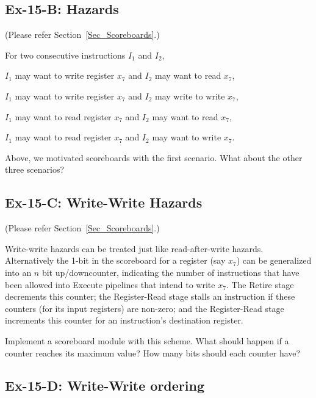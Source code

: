 \subsection*{Ex-15-B: Hazards}
\label{Ex-15-B-Hazards}

(Please refer Section~\ref{Sec_Scoreboards}.)

For two consecutive instructions $I_1$ and $I_2$,
  \begin{tightlist}
    \item $I_1$ may want to write register $x_7$ and $I_2$ may want to read $x_7$,
    \item $I_1$ may want to write register $x_7$ and $I_2$ may write to write $x_7$,
    \item $I_1$ may want to read register $x_7$ and $I_2$ may want to read $x_7$,
    \item $I_1$ may want to read register $x_7$ and $I_2$ may want to write $x_7$.
  \end{tightlist}
Above, we motivated scoreboards with the first scenario.  What about
the other three scenarios?


\subsection*{Ex-15-C: Write-Write Hazards}
\label{Ex-15-C-Write-Write-Hazards}

(Please refer Section~\ref{Sec_Scoreboards}.)

Write-write hazards can be treated just like read-after-write hazards.
Alternatively the 1-bit in the scoreboard for a register (say $x_7$)
can be generalized into an $n$ bit up/downcounter, indicating the
number of instructions that have been allowed into Execute pipelines
that intend to write $x_7$.  The Retire stage decrements this counter;
the Register-Read stage stalls an instruction if these counters (for
its input registers) are non-zero; and the Register-Read stage
increments this counter for an instruction's destination register.

Implement a scoreboard module with this scheme.  What should happen if
a counter reaches its maximum value?  How many bits should each
counter have?


\subsection*{Ex-15-D: Write-Write ordering}
\label{Ex-15-D-Write-Write-ordering}


